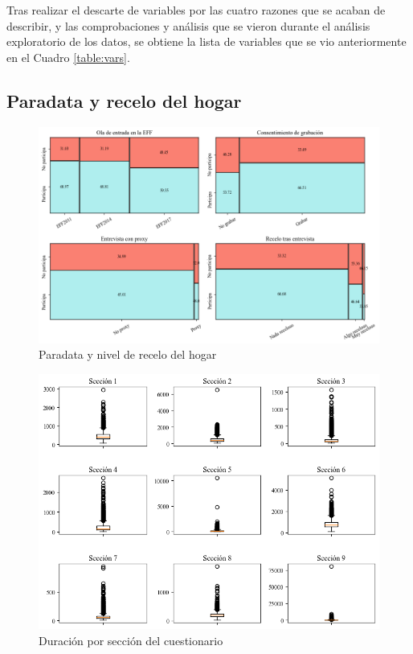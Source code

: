 Tras realizar el descarte de variables por las cuatro razones que se acaban de describir, y las comprobaciones y análisis que se vieron durante el análisis exploratorio de los datos, se obtiene la lista de variables que se vio anteriormente en el Cuadro  \ref{table:vars}.

\subsection*{Paradata y recelo del hogar}

\begin{figure}[h]
	\centering
	\includegraphics[width=1\textwidth]{figs/figure1.png}
	\caption{Paradata y nivel de recelo del hogar}
	\label{fig:fig1}
\end{figure}

\begin{figure}[h]
	\centering
	\includegraphics[width=1\textwidth]{figs/figure4.png}
	\caption{Duración por sección del cuestionario}
	\label{fig:fig4}
\end{figure}

